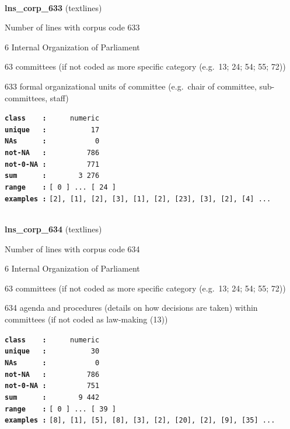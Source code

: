 \documentclass[]{article}
\begin{document}
~

\textbf{lns\_corp\_633} (textlines)

Number of lines with corpus code 633

6 Internal Organization of Parliament

63 committees (if not coded as more specific category (e.g.~13; 24; 54;
55; 72))

633 formal organizational units of committee (e.g.~chair of committee,
sub-committees, staff)

\textbf{\texttt{class\ \ \ \ :}} \texttt{~~~~~numeric}\\
\textbf{\texttt{unique\ \ \ :}} \texttt{~~~~~~~~~~17}\\
\textbf{\texttt{NAs\ \ \ \ \ \ :}} \texttt{~~~~~~~~~~~0}\\
\textbf{\texttt{not-NA\ \ \ :}} \texttt{~~~~~~~~~786}\\
\textbf{\texttt{not-0-NA\ :}} \texttt{~~~~~~~~~771}\\
\textbf{\texttt{sum\ \ \ \ \ \ :}} \texttt{~~~~~~~3~276}\\
\textbf{\texttt{range\ \ \ \ :}}
\texttt{{[}\ 0\ {]}\ ...\ {[}\ 24\ {]}}\\
\textbf{\texttt{examples\ :}}
\texttt{{[}2{]},\ {[}1{]},\ {[}2{]},\ {[}3{]},\ {[}1{]},\ {[}2{]},\ {[}23{]},\ {[}3{]},\ {[}2{]},\ {[}4{]}\ ...}\\

~

\textbf{lns\_corp\_634} (textlines)

Number of lines with corpus code 634

6 Internal Organization of Parliament

63 committees (if not coded as more specific category (e.g.~13; 24; 54;
55; 72))

634 agenda and procedures (details on how decisions are taken) within
committees (if not coded as law-making (13))

\textbf{\texttt{class\ \ \ \ :}} \texttt{~~~~~numeric}\\
\textbf{\texttt{unique\ \ \ :}} \texttt{~~~~~~~~~~30}\\
\textbf{\texttt{NAs\ \ \ \ \ \ :}} \texttt{~~~~~~~~~~~0}\\
\textbf{\texttt{not-NA\ \ \ :}} \texttt{~~~~~~~~~786}\\
\textbf{\texttt{not-0-NA\ :}} \texttt{~~~~~~~~~751}\\
\textbf{\texttt{sum\ \ \ \ \ \ :}} \texttt{~~~~~~~9~442}\\
\textbf{\texttt{range\ \ \ \ :}}
\texttt{{[}\ 0\ {]}\ ...\ {[}\ 39\ {]}}\\
\textbf{\texttt{examples\ :}}
\texttt{{[}8{]},\ {[}1{]},\ {[}5{]},\ {[}8{]},\ {[}3{]},\ {[}2{]},\ {[}20{]},\ {[}2{]},\ {[}9{]},\ {[}35{]}\ ...}\\
\end{document}
